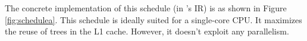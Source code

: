 The concrete implementation of this schedule (in \Treebeard{}'s IR) 
is as shown in Figure \ref{fig:schedulea}.
This schedule is ideally suited for a single-core CPU. It maximizes 
the reuse of trees in the L1 cache. However, it doesn't exploit  
any parallelism. 

